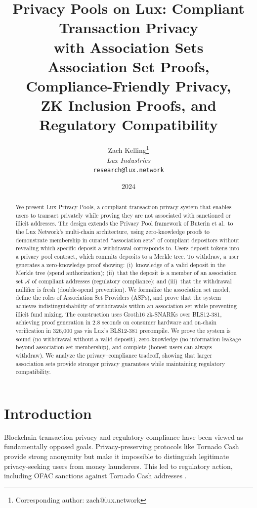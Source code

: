 \documentclass[11pt,a4paper]{article}
\title{\textbf{Privacy Pools on Lux: Compliant Transaction Privacy\\with Association Sets}\\[6pt]
\large Association Set Proofs, Compliance-Friendly Privacy,\\ZK Inclusion Proofs, and Regulatory Compatibility}
\author{
Zach Kelling\thanks{Corresponding author: zach@lux.network}\\
\textit{Lux Industries}\\
\texttt{research@lux.network}
}
\date{2024}
\begin{document}
\luxcoverpage
\maketitle

\begin{abstract}
We present Lux Privacy Pools, a compliant transaction privacy system that enables users to transact privately while proving they are not associated with sanctioned or illicit addresses. The design extends the Privacy Pool framework of Buterin et al.\ to the Lux Network's multi-chain architecture, using zero-knowledge proofs to demonstrate membership in curated ``association sets'' of compliant depositors without revealing which specific deposit a withdrawal corresponds to. Users deposit tokens into a privacy pool contract, which commits deposits to a Merkle tree. To withdraw, a user generates a zero-knowledge proof showing: (i)~knowledge of a valid deposit in the Merkle tree (spend authorization); (ii)~that the deposit is a member of an association set $\mathcal{A}$ of compliant addresses (regulatory compliance); and (iii)~that the withdrawal nullifier is fresh (double-spend prevention). We formalize the association set model, define the roles of Association Set Providers (ASPs), and prove that the system achieves indistinguishability of withdrawals within an association set while preventing illicit fund mixing. The construction uses Groth16 zk-SNARKs over BLS12-381, achieving proof generation in 2.8 seconds on consumer hardware and on-chain verification in 326,000 gas via Lux's BLS12-381 precompile. We prove the system is sound (no withdrawal without a valid deposit), zero-knowledge (no information leakage beyond association set membership), and complete (honest users can always withdraw). We analyze the privacy--compliance tradeoff, showing that larger association sets provide stronger privacy guarantees while maintaining regulatory compatibility.
\end{abstract}

\section{Introduction}

Blockchain transaction privacy and regulatory compliance have been viewed as fundamentally opposed goals. Privacy-preserving protocols like Tornado Cash \cite{pertsev2019tornado} provide strong anonymity but make it impossible to distinguish legitimate privacy-seeking users from money launderers. This led to regulatory action, including OFAC sanctions against Tornado Cash addresses \cite{ofac2022tornado}.
\end{document}
